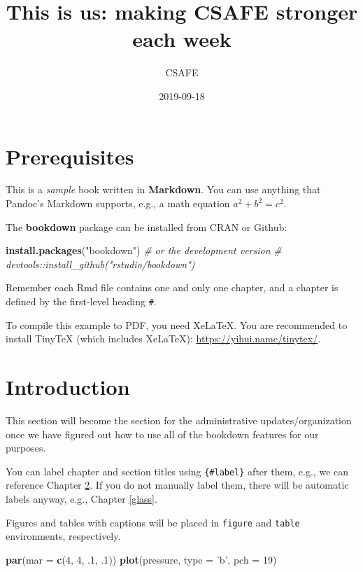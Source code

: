 \documentclass[]{book}
\title{This is us: making CSAFE stronger each week}
\author{CSAFE}
\date{2019-09-18}
\newenvironment{Shaded}{\begin{snugshade}}{\end{snugshade}}
\newcommand{\CommentTok}[1]{\textcolor[rgb]{0.56,0.35,0.01}{\textit{#1}}}
\newcommand{\DataTypeTok}[1]{\textcolor[rgb]{0.13,0.29,0.53}{#1}}
\newcommand{\DecValTok}[1]{\textcolor[rgb]{0.00,0.00,0.81}{#1}}
\newcommand{\FloatTok}[1]{\textcolor[rgb]{0.00,0.00,0.81}{#1}}
\newcommand{\KeywordTok}[1]{\textcolor[rgb]{0.13,0.29,0.53}{\textbf{#1}}}
\newcommand{\NormalTok}[1]{#1}
\newcommand{\StringTok}[1]{\textcolor[rgb]{0.31,0.60,0.02}{#1}}
\begin{document}
\maketitle

{
\setcounter{tocdepth}{1}
\tableofcontents
}
\hypertarget{prerequisites}{%
\chapter{Prerequisites}\label{prerequisites}}

This is a \emph{sample} book written in \textbf{Markdown}. You can use anything that Pandoc's Markdown supports, e.g., a math equation \(a^2 + b^2 = c^2\).

The \textbf{bookdown} package can be installed from CRAN or Github:

\begin{Shaded}
\begin{Highlighting}[]
\KeywordTok{install.packages}\NormalTok{(}\StringTok{"bookdown"}\NormalTok{)}
\CommentTok{# or the development version}
\CommentTok{# devtools::install_github("rstudio/bookdown")}
\end{Highlighting}
\end{Shaded}

Remember each Rmd file contains one and only one chapter, and a chapter is defined by the first-level heading \texttt{\#}.

To compile this example to PDF, you need XeLaTeX. You are recommended to install TinyTeX (which includes XeLaTeX): \url{https://yihui.name/tinytex/}.

\hypertarget{intro}{%
\chapter{Introduction}\label{intro}}

This section will become the section for the administrative updates/organization once we have figured out how to use all of the bookdown features for our purposes.

You can label chapter and section titles using \texttt{\{\#label\}} after them, e.g., we can reference Chapter \ref{intro}. If you do not manually label them, there will be automatic labels anyway, e.g., Chapter \ref{glass}.

Figures and tables with captions will be placed in \texttt{figure} and \texttt{table} environments, respectively.

\begin{Shaded}
\begin{Highlighting}[]
\KeywordTok{par}\NormalTok{(}\DataTypeTok{mar =} \KeywordTok{c}\NormalTok{(}\DecValTok{4}\NormalTok{, }\DecValTok{4}\NormalTok{, }\FloatTok{.1}\NormalTok{, }\FloatTok{.1}\NormalTok{))}
\KeywordTok{plot}\NormalTok{(pressure, }\DataTypeTok{type =} \StringTok{'b'}\NormalTok{, }\DataTypeTok{pch =} \DecValTok{19}\NormalTok{)}
\end{Highlighting}
\end{Shaded}
\end{document}
